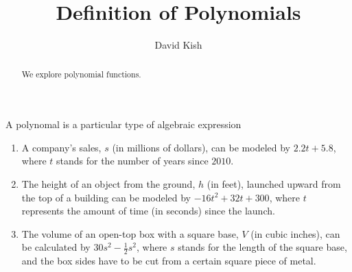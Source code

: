 \documentclass{ximera}
\author{David Kish}
\title{Definition of Polynomials}
\begin{document}
\begin{abstract}
We explore polynomial functions.
\end{abstract}
\maketitle
A polynomal is a particular type of algebraic expression
\begin{enumerate}
\item       A company's sales, $s$
            (in millions of dollars),
            can be modeled by $2.2t+5.8$,
            where $t$ stands for the number of years since $2010$.
\item     The height of an object from the ground, $h$
            (in feet),
            launched upward from the top of a building can be modeled by $-16t^2+32t+300$,
            where $t$ represents the amount of time
            (in seconds)
            since the launch.
 \item The volume of an open-top box with a square base, $V$
            (in cubic inches),
            can be calculated by $30s^2-\frac{1}{2}s^2$,
            where $s$ stands for the length of the square base,
            and the box sides have to be cut from a certain square piece of metal.
\end{enumerate}
\end{document}
